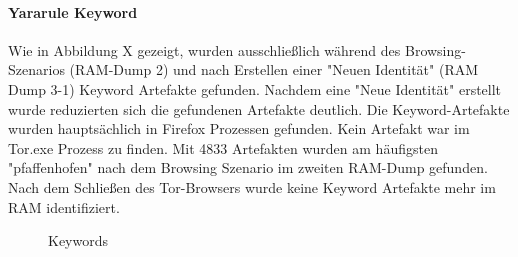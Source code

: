 \paragraph*{Yararule Keyword}
Wie in Abbildung X gezeigt, wurden ausschließlich während des Browsing-Szenarios (RAM-Dump 2) und nach Erstellen einer "Neuen Identität" (RAM Dump 3-1) Keyword Artefakte gefunden.
Nachdem eine "Neue Identität" erstellt wurde reduzierten sich die gefundenen Artefakte deutlich. 
Die Keyword-Artefakte wurden hauptsächlich in Firefox Prozessen gefunden. Kein Artefakt war im Tor.exe Prozess zu finden.
Mit 4833 Artefakten wurden am häufigsten "pfaffenhofen" nach dem Browsing Szenario im zweiten RAM-Dump gefunden. 
Nach dem Schließen des Tor-Browsers wurde keine Keyword Artefakte mehr im RAM identifiziert.
\begin{figure}[h!]
	\centerline{}
	\label{chart:final-criteria}  
	\caption{Keywords}
\end{figure}

